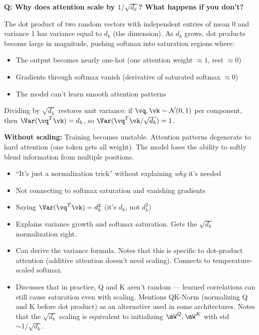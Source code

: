 \begin{interviewq}
\textbf{Q: Why does attention scale by $1/\sqrt{d_k}$? What happens if you don't?}

 \quad {} \quad \badgefreq{\freqhigh}

\stronganswer The dot product of two random vectors with independent entries of mean 0 and variance 1 has variance equal to $d_k$ (the dimension). As $d_k$ grows, dot products become large in magnitude, pushing softmax into saturation regions where:

\begin{itemize}
    \item The output becomes nearly one-hot (one attention weight $\approx 1$, rest $\approx 0$)
    \item Gradients through softmax vanish (derivative of saturated softmax $\approx 0$)
    \item The model can't learn smooth attention patterns
\end{itemize}

Dividing by $\sqrt{d_k}$ restores unit variance: if $\vq, \vk \sim \mathcal{N}(0, 1)$ per component, then $\Var(\vq^T \vk) = d_k$, so $\Var(\vq^T \vk / \sqrt{d_k}) = 1$.

\textbf{Without scaling:} Training becomes unstable. Attention patterns degenerate to hard attention (one token gets all weight). The model loses the ability to softly blend information from multiple positions.

\redflags
\begin{itemize}
    \item ``It's just a normalization trick'' without explaining \textit{why} it's needed
    \item Not connecting to softmax saturation and vanishing gradients
    \item Saying $\Var(\vq^T \vk) = d_k^2$ (it's $d_k$, not $d_k^2$)
\end{itemize}


\goodgreat
\begin{itemize}
    \item {} Explains variance growth and softmax saturation. Gets the $\sqrt{d_k}$ normalization right.
    \item {} Can derive the variance formula. Notes that this is specific to dot-product attention (additive attention doesn't need scaling). Connects to temperature-scaled softmax.
    \item {} Discusses that in practice, Q and K aren't random --- learned correlations can still cause saturation even with scaling. Mentions QK-Norm (normalizing Q and K before dot product) as an alternative used in some architectures. Notes that the $\sqrt{d_k}$ scaling is equivalent to initializing $\mW^Q, \mW^K$ with std $\sim 1/\sqrt{d_k}$.
\end{itemize}


\end{interviewq}
